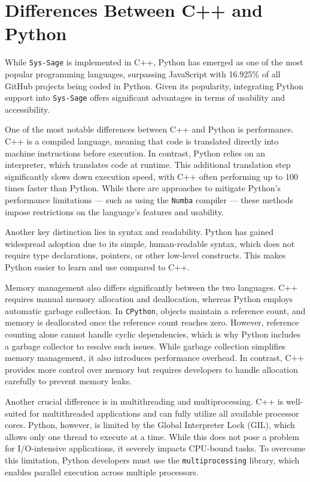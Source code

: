 \section{Differences Between C++ and Python}

While \texttt{Sys-Sage} is implemented in C++, Python has emerged as one of the most popular programming languages, surpassing JavaScript with 16.925\% of all GitHub projects being coded in Python. Given its popularity, integrating Python support into \texttt{Sys-Sage} offers significant advantages in terms of usability and accessibility. \cite{languages-github-stats}

One of the most notable differences between C++ and Python is performance. C++ is a compiled language, meaning that code is translated directly into machine instructions before execution. In contrast, Python relies on an interpreter, which translates code at runtime. This additional translation step significantly slows down execution speed, with C++ often performing up to 100 times faster than Python. While there are approaches to mitigate Python's performance limitations — such as using the \texttt{Numba} compiler\parencite{numba} — these methods impose restrictions on the language’s features and usability.\cite{languages-performance}

Another key distinction lies in syntax and readability. Python has gained widespread adoption due to its simple, human-readable syntax, which does not require type declarations, pointers, or other low-level constructs. This makes Python easier to learn and use compared to C++.

Memory management also differs significantly between the two languages. C++ requires manual memory allocation and deallocation, whereas Python employs automatic garbage collection. In \texttt{CPython}, objects maintain a reference count, and memory is deallocated once the reference count reaches zero. However, reference counting alone cannot handle cyclic dependencies, which is why Python includes a garbage collector to resolve such issues. While garbage collection simplifies memory management, it also introduces performance overhead. In contrast, C++ provides more control over memory but requires developers to handle allocation carefully to prevent memory leaks.\cite{python-gc}

Another crucial difference is in multithreading and multiprocessing. C++ is well-suited for multithreaded applications and can fully utilize all available processor cores. Python, however, is limited by the Global Interpreter Lock (GIL), which allows only one thread to execute at a time. While this does not pose a problem for \ac{I/O}-intensive applications, it severely impacts CPU-bound tasks. To overcome this limitation, Python developers must use the \texttt{multiprocessing} library, which enables parallel execution across multiple processors.\parencite{python-threading}

